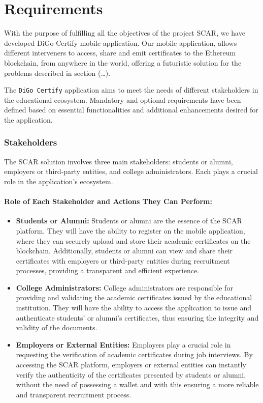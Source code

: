 %
%
\chapter{Requirements}\label{chap:requirements}

With the purpose of fulfilling all the objectives of the project SCAR, we have developed DiGo Certify mobile application. Our mobile application, allows different interveners to access, share and emit certificates to the Ethereum blockchain, from anywhere in the world, offering a futuristic solution for the problems described in section (…).

The \texttt{DiGo Certify} application aims to meet the needs of different stakeholders in the educational ecosystem. Mandatory and optional requirements have been defined based on essential functionalities and additional enhancements desired for the application.

\subsection{Stakeholders}\label{subsec:stakeholders}
The SCAR solution involves three main stakeholders: students or alumni, employers or third-party entities, and college administrators. Each plays a crucial role in the application's ecosystem.

\subsubsection{Role of Each Stakeholder and Actions They Can Perform:}

\begin{itemize}

    \item \textbf{Students or Alumni:} Students or alumni are the essence of the SCAR platform. They will have the ability to register on the mobile application, where they can securely upload and store their academic certificates on the blockchain. Additionally, students or alumni can view and share their certificates with employers or third-party entities during recruitment processes, providing a transparent and efficient experience.

    \item \textbf{College Administrators:} College administrators are responsible for providing and validating the academic certificates issued by the educational institution. They will have the ability to access the application to issue and authenticate students' or alumni's certificates, thus ensuring the integrity and validity of the documents.

    \item \textbf{Employers or External Entities:} Employers play a crucial role in requesting the verification of academic certificates during job interviews. By accessing the SCAR platform, employers or external entities can instantly verify the authenticity of the certificates presented by students or alumni, without the need of possessing a wallet and with this ensuring a more reliable and transparent recruitment process.

\end{itemize}

